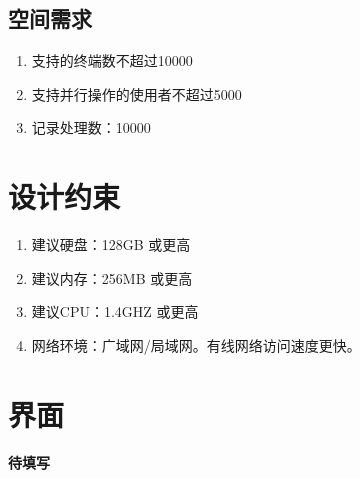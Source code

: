 \subsection{空间需求}
\begin{enumerate}
    \item 支持的终端数不超过10000
    \item 支持并行操作的使用者不超过5000
    \item 记录处理数：10000
\end{enumerate}
\section{设计约束}
\begin{enumerate}
    \item 建议硬盘：128GB 或更高
    \item 建议内存：256MB 或更高
    \item 建议CPU：1.4GHZ 或更高
    \item 网络环境：广域网/局域网。有线网络访问速度更快。
\end{enumerate}
\section{界面}
\textbf{待填写}